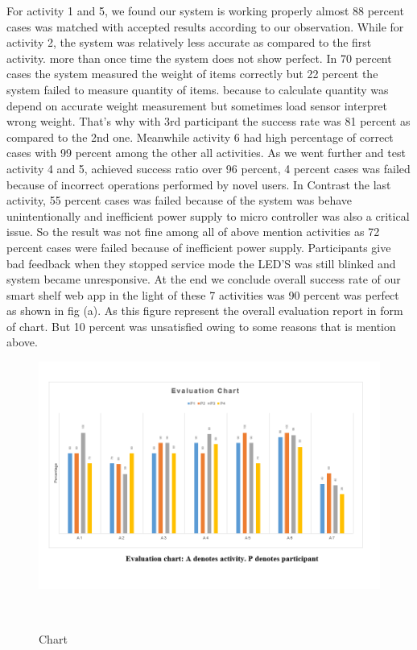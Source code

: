 For activity 1 and 5, we found our system is working properly almost 88 percent cases was matched with accepted results according to our observation.
While for activity 2, the system was relatively less accurate as compared to the first activity. more than once time the system does not show perfect. In 70 percent cases the system measured the weight of items correctly but 22 percent the system failed to measure quantity of items. because to calculate quantity was depend on accurate weight measurement but sometimes load sensor interpret wrong weight. That's why with 3rd participant the success rate was 81 percent as compared to the 2nd one. 
Meanwhile activity 6 had high percentage of correct cases with 99 percent among the other all activities.
As we went further and test activity 4 and 5, achieved success ratio over 96 percent, 4 percent cases was failed because of incorrect operations performed by novel users.
In Contrast the last activity, 55 percent cases was failed because of the system was behave unintentionally and inefficient power supply to micro controller was also a critical issue. So the result was not fine among all of above mention activities as 72 percent cases were failed because of inefficient power supply. Participants give bad feedback when they stopped service mode the LED'S was still blinked and system became unresponsive. 
At the end we conclude overall success rate of our smart shelf web app in the light of these 7 activities was 90 percent was perfect as shown in fig (a). As this figure represent the overall evaluation report in form of chart. But 10 percent was unsatisfied owing to some reasons that is mention above.
%
\begin{figure}
	\includegraphics[width=1.1\columnwidth]{figures/Chart}
	\caption{Chart}~\label{fig:Chart}
\end{figure}
%


